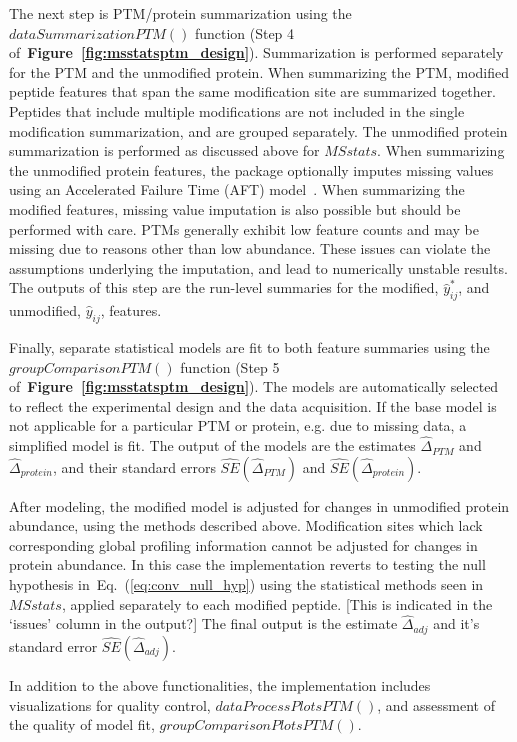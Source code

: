 \documentclass[mcp]{article}
\numberwithin{table}{section}
\def\todo#1{{\color{red}[#1]}}
\def\eqref#1{Eq.~(\ref{eq:#1})}
\def\figref#1{{\bf Figure~\ref{fig:#1}}}
\begin{document}
The next step is PTM/protein summarization using the $dataSummarizationPTM()$ function (Step 4 of~\figref{msstatsptm_design}). Summarization is performed separately for the PTM and the unmodified protein. When summarizing the PTM, modified peptide features that span the same modification site are summarized together. Peptides that include multiple modifications are not included in the single modification summarization, and are grouped separately. The unmodified protein summarization is performed as discussed above for $MSstats$. When summarizing the unmodified protein features, the package optionally imputes missing values using an Accelerated Failure Time (AFT) model~\cite{Wei:1992}. When summarizing the modified features, missing value imputation is also possible but should be performed with care. PTMs generally exhibit low feature counts and may be missing due to reasons other than low abundance. These issues can violate the assumptions underlying the imputation, and lead to numerically unstable results. The outputs of this step are the run-level summaries for the modified, $\hat{y}_{ij}^{\ast}$, and unmodified, $\hat{y}_{ij}$, features.

Finally, separate statistical models are fit to both feature summaries using the $groupComparisonPTM()$ function (Step 5 of~\figref{msstatsptm_design}). The models are automatically selected to reflect the experimental design and the data acquisition. If the base model is not applicable for a particular PTM or protein, e.g. due to missing data, a simplified model is fit. The output of the models are the estimates $\hat{\Delta}_{PTM}$ and $\hat{\Delta}_{protein}$, and their standard errors $\widehat{SE}(\hat{\Delta}_{PTM})$ and $\widehat{SE}(\hat{\Delta}_{protein})$. 

After modeling, the modified model is adjusted for changes in unmodified protein abundance, using the methods described above. Modification sites which lack corresponding global profiling information cannot be adjusted for changes in protein abundance. In this case the implementation reverts to testing the null hypothesis in~\eqref{conv_null_hyp} using the statistical methods seen in $MSstats$, applied separately to each modified peptide. \todo{This is indicated in the `issues' column in the output?} The final output is the estimate $\hat{\Delta}_{adj}$ and it's standard error $\widehat{SE}(\hat{\Delta}_{adj})$.

In addition to the above functionalities, the implementation includes visualizations for quality control, $dataProcessPlotsPTM()$, and assessment of the quality of model fit, $groupComparisonPlotsPTM()$.
\end{document}

